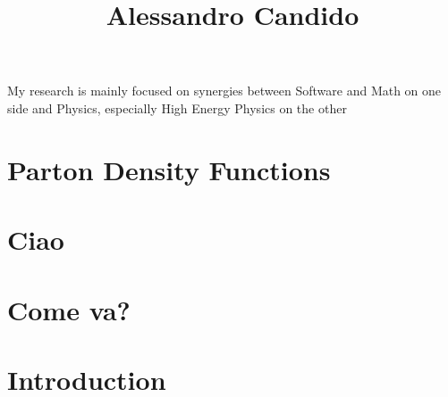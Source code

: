 \documentclass[10pt, a4paper, sans]{moderncv}
\title{Alessandro Candido}
\begin{document}
\makecvtitle


My research is mainly focused on synergies between Software and Math on one
side and Physics, especially High Energy Physics on the other

\begin{multicols}{2}

\section{Parton Density Functions}
\blindtext\blindtext

\section{Ciao}
\blindtext\blindtext

\section{Come va?}
\blindtext\blindtext

\section{Introduction}
\blindtext\blindtext
\blindtext\blindtext

\end{multicols}

\makecvfoot
\end{document}
